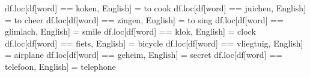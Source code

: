 \documentclass[
  letterpaper,
  DIV=11,
  numbers=noendperiod]{scrreprt}
\newenvironment{Shaded}{\begin{snugshade}}{\end{snugshade}}
\newcommand{\NormalTok}[1]{\textcolor[rgb]{0.00,0.23,0.31}{#1}}
\newcommand{\OperatorTok}[1]{\textcolor[rgb]{0.37,0.37,0.37}{#1}}
\newcommand{\StringTok}[1]{\textcolor[rgb]{0.13,0.47,0.30}{#1}}
\begin{document}
\begin{Shaded}
\begin{Highlighting}[]
\NormalTok{df.loc[df[}\StringTok{\textquotesingle{}word\textquotesingle{}}\NormalTok{] }\OperatorTok{==} \StringTok{\textquotesingle{}koken\textquotesingle{}}\NormalTok{, }\StringTok{\textquotesingle{}English\textquotesingle{}}\NormalTok{] }\OperatorTok{=} \StringTok{\textquotesingle{}to cook\textquotesingle{}}
\NormalTok{df.loc[df[}\StringTok{\textquotesingle{}word\textquotesingle{}}\NormalTok{] }\OperatorTok{==} \StringTok{\textquotesingle{}juichen\textquotesingle{}}\NormalTok{, }\StringTok{\textquotesingle{}English\textquotesingle{}}\NormalTok{] }\OperatorTok{=} \StringTok{\textquotesingle{}to cheer\textquotesingle{}}
\NormalTok{df.loc[df[}\StringTok{\textquotesingle{}word\textquotesingle{}}\NormalTok{] }\OperatorTok{==} \StringTok{\textquotesingle{}zingen\textquotesingle{}}\NormalTok{, }\StringTok{\textquotesingle{}English\textquotesingle{}}\NormalTok{] }\OperatorTok{=} \StringTok{\textquotesingle{}to sing\textquotesingle{}}
\NormalTok{df.loc[df[}\StringTok{\textquotesingle{}word\textquotesingle{}}\NormalTok{] }\OperatorTok{==} \StringTok{\textquotesingle{}glimlach\textquotesingle{}}\NormalTok{, }\StringTok{\textquotesingle{}English\textquotesingle{}}\NormalTok{] }\OperatorTok{=} \StringTok{\textquotesingle{}smile\textquotesingle{}}
\NormalTok{df.loc[df[}\StringTok{\textquotesingle{}word\textquotesingle{}}\NormalTok{] }\OperatorTok{==} \StringTok{\textquotesingle{}klok\textquotesingle{}}\NormalTok{, }\StringTok{\textquotesingle{}English\textquotesingle{}}\NormalTok{] }\OperatorTok{=} \StringTok{\textquotesingle{}clock\textquotesingle{}}
\NormalTok{df.loc[df[}\StringTok{\textquotesingle{}word\textquotesingle{}}\NormalTok{] }\OperatorTok{==} \StringTok{\textquotesingle{}fiets\textquotesingle{}}\NormalTok{, }\StringTok{\textquotesingle{}English\textquotesingle{}}\NormalTok{] }\OperatorTok{=} \StringTok{\textquotesingle{}bicycle\textquotesingle{}}
\NormalTok{df.loc[df[}\StringTok{\textquotesingle{}word\textquotesingle{}}\NormalTok{] }\OperatorTok{==} \StringTok{\textquotesingle{}vliegtuig\textquotesingle{}}\NormalTok{, }\StringTok{\textquotesingle{}English\textquotesingle{}}\NormalTok{] }\OperatorTok{=} \StringTok{\textquotesingle{}airplane\textquotesingle{}}
\NormalTok{df.loc[df[}\StringTok{\textquotesingle{}word\textquotesingle{}}\NormalTok{] }\OperatorTok{==} \StringTok{\textquotesingle{}geheim\textquotesingle{}}\NormalTok{, }\StringTok{\textquotesingle{}English\textquotesingle{}}\NormalTok{] }\OperatorTok{=} \StringTok{\textquotesingle{}secret\textquotesingle{}}
\NormalTok{df.loc[df[}\StringTok{\textquotesingle{}word\textquotesingle{}}\NormalTok{] }\OperatorTok{==} \StringTok{\textquotesingle{}telefoon\textquotesingle{}}\NormalTok{, }\StringTok{\textquotesingle{}English\textquotesingle{}}\NormalTok{] }\OperatorTok{=} \StringTok{\textquotesingle{}telephone\textquotesingle{}}

\end{Highlighting}
\end{Shaded}
\end{document}
